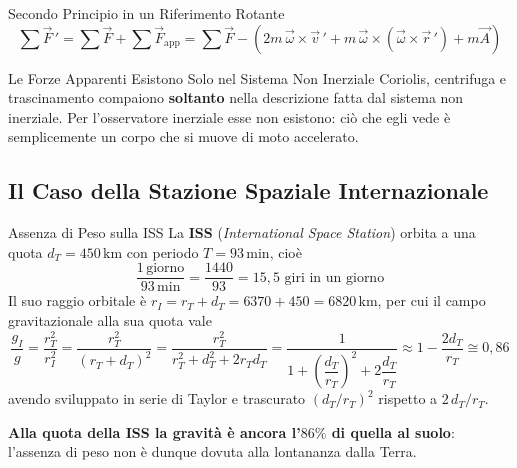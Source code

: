 \begin{formulario}{Secondo Principio in un Riferimento Rotante}
\begin{equation}
    \sum\vec{F}\,' = \sum\vec{F} + \sum\vec{F}_{\text{app}}
    = \sum\vec{F} - \left(2m\,\vec{\omega}\times\vec{v}\,' + m\,\vec{\omega}\times(\vec{\omega}\times\vec{r}\,') + m\vec{A}\right)
\end{equation}
\end{formulario}

\begin{attenzione}{Le Forze Apparenti Esistono Solo nel Sistema Non Inerziale}
Coriolis, centrifuga e trascinamento compaiono \textbf{soltanto} nella descrizione fatta dal sistema non inerziale. Per l'osservatore inerziale esse non esistono: ciò che egli vede è semplicemente un corpo che si muove di moto accelerato.
\end{attenzione}

\subsection{Il Caso della Stazione Spaziale Internazionale}

\begin{esempio}{Assenza di Peso sulla ISS}
La \textbf{ISS} (\emph{International Space Station}) orbita a una quota $d_T = 450\,\mathrm{km}$ con periodo $T = 93\,\mathrm{min}$, cioè
\begin{equation*}
    \frac{1\,\text{giorno}}{93\,\mathrm{min}} = \frac{1440}{93} = 15{,}5 \text{ giri in un giorno}
\end{equation*}
Il suo raggio orbitale è $r_I = r_T + d_T = 6370 + 450 = 6820\,\mathrm{km}$, per cui il campo gravitazionale alla sua quota vale
\begin{equation}
    \frac{g_I}{g} = \frac{r_T^2}{r_I^2} = \frac{r_T^2}{(r_T + d_T)^2}
    = \frac{r_T^2}{r_T^2 + d_T^2 + 2r_Td_T}
    = \frac{1}{1 + \left(\dfrac{d_T}{r_T}\right)^{\!2} + 2\dfrac{d_T}{r_T}}
    \approx 1 - \frac{2d_T}{r_T} \cong 0{,}86
\end{equation}
avendo sviluppato in serie di Taylor e trascurato $(d_T/r_T)^2$ rispetto a $2\,d_T/r_T$.

\textbf{Alla quota della ISS la gravità è ancora l'$86\%$ di quella al suolo}: l'assenza di peso non è dunque dovuta alla lontananza dalla Terra.
\end{esempio}

